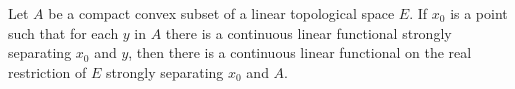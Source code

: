 Let $A$ be a compact convex subset of a linear topological space $E$. If $x_0$ is a point such that for each $y$ in $A$ there is a continuous linear functional strongly separating $x_0$ and $y$, then there is a continuous linear functional on the real restriction of $E$ strongly separating $x_0$ and $A$.
